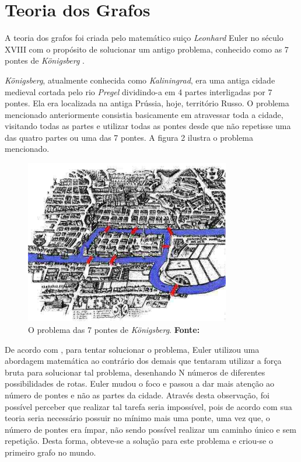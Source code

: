 \section{Teoria dos Grafos}

\par A teoria dos grafos foi criada pelo matemático suiço \textit{Leonhard} Euler no século XVIII com o propósito de solucionar um antigo problema, conhecido como as 7 pontes de \textit{Königsberg} \cite{harju_graph_theory}.

\par \textit{Königsberg}, atualmente conhecida como \textit{Kaliningrad}, era uma antiga cidade medieval cortada pelo rio \textit{Pregel} dividindo-a em 4 partes interligadas por 7 pontes. Ela era localizada na antiga Prússia, hoje, território Russo. O problema mencionado anteriormente consistia basicamente em atravessar toda a cidade, visitando todas as partes e utilizar todas as pontes desde que não repetisse uma das quatro partes ou uma das 7 pontes. A figura 2 ilustra o problema mencionado.

\begin{figure}[h!]
	\centerline{\includegraphics[height=0.26\textheight,width=0.8\textwidth]{./imagens/Konigsberg_7_bridges.jpg}}
	\caption[O problema das 7 pontes de \textit{Königsberg} ]
	{O problema das 7 pontes de \textit{Königsberg}. \textbf{Fonte:} }
	\label{fig:exemplo1}
\end{figure}

\par De acordo com , para tentar solucionar o problema, Euler utilizou uma abordagem matemática ao contrário dos demais que tentaram utilizar a força bruta para solucionar tal problema, desenhando N números de diferentes possibilidades de rotas. Euler mudou o foco e passou a dar mais atenção ao número de pontes e não as partes da cidade. Através desta observação, foi possível perceber que realizar tal tarefa seria impossível, pois de acordo com sua teoria seria necessário possuir no mínimo mais uma ponte, uma vez que, o número de pontes era ímpar, não sendo possível realizar um caminho único e sem repetição. Desta forma, obteve-se a solução para este problema e criou-se o primeiro grafo no mundo.

